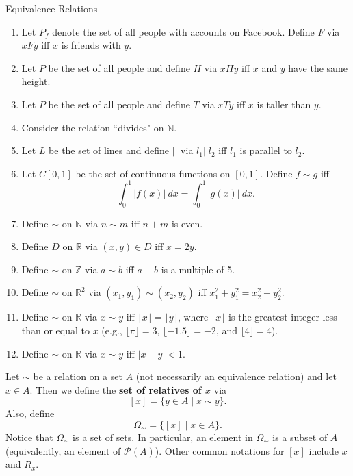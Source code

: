 \begin{section}{Equivalence Relations}
\begin{exercise}
\begin{enumerate}[label=\textrm{(\alph*)}]
\item\label{exer:facebook} Let $P_f$ denote the set of all people with accounts on Facebook.  Define  $F$ via $xFy$ iff $x$ is friends with $y$. 
\item Let $P$ be the set of all people and define $H$ via $xHy$ iff $x$ and $y$ have the same height.
\item Let $P$ be the set of all people and define $T$ via $xTy$ iff $x$ is taller than $y$.
\item Consider the relation ``divides" on $\mathbb{N}$.
\item Let $L$ be the set of lines and define $||$ via $l_1||l_2$ iff $l_1$ is parallel to $l_2$.
\item Let $C[0,1]$ be the set of continuous functions on $[0,1]$.  Define $f\sim g$ iff
\[
\int_0^1|f(x)|\ dx=\int_0^1|g(x)|\ dx.
\]
\item Define $\sim$ on $\mathbb{N}$ via $n\sim m$ iff $n+m$ is even.
\item Define $D$ on $\mathbb{R}$ via $(x,y)\in D$ iff $x=2y$.
\item\label{exer:mod 5} Define $\sim$ on $\mathbb{Z}$ via $a\sim b$ iff $a-b$ is a multiple of 5.
\item Define $\sim$ on $\mathbb{R}^2$ via $(x_1,y_1)\sim (x_2,y_2)$ iff $x_1^2+y_1^2=x_2^2+y_2^2$.
\item Define $\sim$ on $\mathbb{R}$ via $x\sim y$ iff $\lfloor x\rfloor =\lfloor y\rfloor$, where $\lfloor x\rfloor$ is the greatest integer less than or equal to $x$ (e.g., $\lfloor \pi\rfloor=3$, $\lfloor -1.5\rfloor=-2$, and $\lfloor 4\rfloor=4$).
\item Define $\sim$ on $\mathbb{R}$ via $x \sim y$ iff $|x-y|<1$.
\end{enumerate}
\end{exercise}

\begin{definition}\label{def:relatives}
Let $\sim$ be a relation on a set $A$ (not necessarily an equivalence relation) and let $x\in A$.  Then we define the \textbf{set of relatives of $x$} via
\[
[x]=\{y\in A\mid x\sim y\}.
\]
Also, define
\[
\Omega_{\sim}=\{[x]\mid x\in A\}.
\]
Notice that $\Omega_{\sim}$ is a set of sets.  In particular, an element in $\Omega_{\sim}$ is a subset of $A$ (equivalently, an element of $\mathcal{P}(A)$).  Other common notations for $[x]$ include $\overline{x}$ and $R_x$.
\end{definition}


\end{section}
